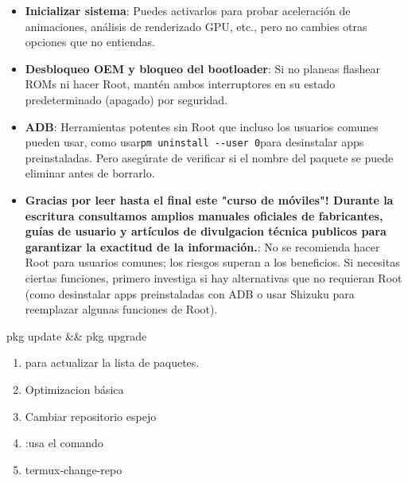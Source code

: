 
\begin{itemize}
  \item \textbf{Inicializar sistema}: Puedes activarlos para probar aceleración de animaciones, análisis de renderizado GPU, etc., pero no cambies otras opciones que no entiendas.
  \item \textbf{Desbloqueo OEM y bloqueo del bootloader}: Si no planeas flashear ROMs ni hacer Root, mantén ambos interruptores en su estado predeterminado (apagado) por seguridad.
  \item \textbf{ADB}: Herramientas potentes sin Root que incluso los usuarios comunes pueden usar, como usar\texttt{pm uninstall -\allowbreak -\allowbreak user 0}para desinstalar apps preinstaladas. Pero asegúrate de verificar si el nombre del paquete se puede eliminar antes de borrarlo.
  \item \textbf{Gracias por leer hasta el final este "curso de móviles"! Durante la escritura consultamos amplios manuales oficiales de fabricantes, guías de usuario y artículos de divulgacion técnica publicos para garantizar la exactitud de la información.}: No se recomienda hacer Root para usuarios comunes; los riesgos superan a los beneficios. Si necesitas ciertas funciones, primero investiga si hay alternativas que no requieran Root (como desinstalar apps preinstaladas con ADB o usar Shizuku para reemplazar algunas funciones de Root).
\end{itemize}

\begin{tcbpractice}{pkg update \&\& pkg upgrade}
\begin{enumerate}
  \item para actualizar la lista de paquetes.
  \item Optimizacion básica
  \item Cambiar repositorio espejo
  \item :usa el comando
  \item termux-change-repo
\end{enumerate}

\end{tcbpractice}
